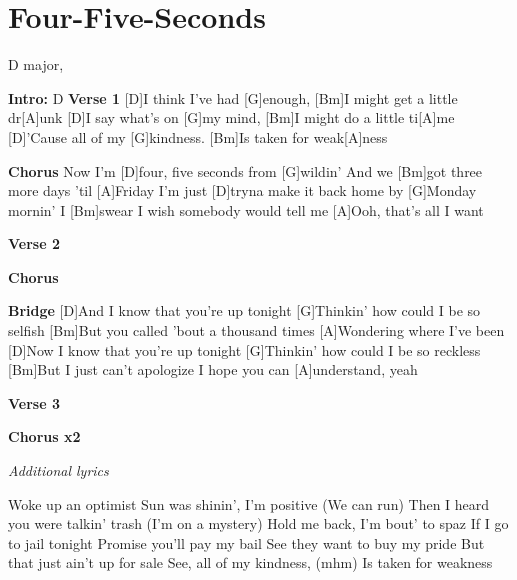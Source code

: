 \documentclass[../../songbookMain]{subfiles}
\begin{document}
\section{Four-Five-Seconds}
{\tiny
D major,
}

\begin{guitar}
\begin{multicols}{2}

\newpage
\textbf{Intro:} D
\textbf{Verse 1}
[D]I think I've had [G]enough, 
[Bm]I might get a little dr[A]unk
[D]I say what's on [G]my mind,
[Bm]I might do a little ti[A]me
[D]'Cause all of my [G]kindness. 
[Bm]Is taken for weak[A]ness

\textbf{Chorus}
Now I'm [D]four, five seconds from [G]wildin'
And we [Bm]got three more days 'til [A]Friday
I'm just [D]tryna make it back home by [G]Monday mornin'
I [Bm]swear I wish somebody would tell me
[A]Ooh, that's all I want

\textbf{Verse 2}

\textbf{Chorus}

\textbf{Bridge}
[D]And I know that you're up tonight
[G]Thinkin' how could I be so selfish
[Bm]But you called 'bout a thousand times
[A]Wondering where I've been
[D]Now I know that you're up tonight
[G]Thinkin' how could I be so reckless
[Bm]But I just can't apologize
I hope you can [A]understand, yeah

\textbf{Verse 3}

\textbf{Chorus x2}


\end{multicols}

\begin{center}
\textit{Additional lyrics}
\end{center}

\begin{multicols}{2}\begin{flushleft}
Woke up an optimist
Sun was shinin', I'm positive (We can run)
Then I heard you were talkin' trash (I'm on a mystery)
Hold me back, I'm bout' to spaz
\columnbreak
If I go to jail tonight
Promise you'll pay my bail
See they want to buy my pride
But that just ain't up for sale
See, all of my kindness, (mhm)
Is taken for weakness

\end{flushleft}
\end{multicols}
\end{guitar}
\end{document}
